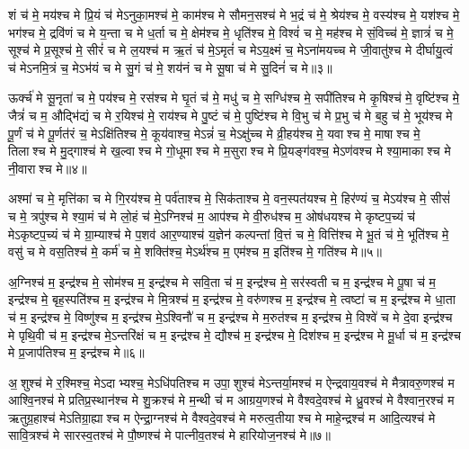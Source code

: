 शं च॑ मे॒ मय॑श्च मे प्रि॒यं च॑ मेऽनुका॒मश्च॑ मे॒ काम॑श्च मे सौमन॒सश्च॑ मे भ॒द्रं च॑ मे॒ श्रेय॑श्च मे॒ वस्य॑श्च मे॒ यश॑श्च मे॒ भग॑श्च मे॒ द्रवि॑णं च मे य॒न्ता च मे ध॒र्ता च मे॒ क्षेम॑श्च मे॒ धृति॑श्च मे॒ विश्वं॑ च मे॒ मह॑श्च मे सं॒विच्च॑ मे॒ ज्ञात्रं॑ च मे॒ सूश्च॑ मे प्र॒सूश्च॑ मे॒ सीरं॑ च मे ल॒यश्च॑ म ऋ॒तं च॑ मे॒ऽमृतं॑ च मेऽय॒क्ष्मं च॒ मेऽना॑मयच्च मे जी॒वातु॑श्च मे दीर्घायु॒त्वं च॑ मेऽनमि॒त्रं च॒ मेऽभ॑यं च मे सु॒गं च॑ मे॒ शय॑नं च मे सू॒षा च॑ मे सु॒दिनं॑ च मे॥३॥ 

ऊर्क्च॑ मे सू॒नृता॑ च मे॒ पय॑श्च मे॒ रस॑श्च मे घृ॒तं च॑ मे॒ मधु॑ च मे॒ सग्धि॑श्च मे॒ सपी॑तिश्च मे कृ॒षिश्च॑ मे॒ वृष्टि॑श्च मे॒ जैत्रं॑ च म॒ औद्भि॑द्यं च मे र॒यिश्च॑ मे॒ राय॑श्च मे पु॒ष्टं च॑ मे॒ पुष्टि॑श्च मे वि॒भु च॑ मे प्र॒भु च॑ मे ब॒हु च॑ मे॒ भूय॑श्च मे पू॒र्णं च॑ मे पू॒र्णत॑रं च॒ मेऽक्षि॑तिश्च मे॒ कूय॑वाश्च॒ मेऽन्नं॑ च॒ मेऽक्षु॑च्च मे व्री॒हय॑श्च मे॒ यवाश्च मे॒ माषाश्च मे॒ तिलाश्च मे मु॒द्गाश्च॑ मे ख॒ल्वाश्च मे गो॒धूमाश्च मे म॒सुराश्च मे प्रि॒यङ्ग॑वश्च॒ मेऽण॑वश्च मे श्या॒माकाश्च मे नी॒वाराश्च मे॥४॥ 

अश्मा॑ च मे॒ मृत्ति॑का च मे गि॒रय॑श्च मे॒ पर्व॑ताश्च मे॒ सिक॑ताश्च मे॒ वन॒स्पत॑यश्च मे॒ हिर॑ण्यं च॒ मेऽय॑श्च मे॒ सीसं॑ च मे॒ त्रपु॑श्च मे श्या॒मं च॑ मे लो॒हं च॑ मे॒ऽग्निश्च॑ म॒ आप॑श्च मे वी॒रुध॑श्च म॒ ओष॑धयश्च मे कृष्टप॒च्यं च॑ मेऽकृष्टप॒च्यं च॑ मे ग्रा॒म्याश्च॑ मे प॒शव॑ आर॒ण्याश्च॑ य॒ज्ञेन॑ कल्पन्तां वि॒त्तं च मे॒ वित्ति॑श्च मे भू॒तं च॑ मे॒ भूति॑श्च मे॒ वसु॑ च मे वस॒तिश्च॑ मे॒ कर्म॑ च मे॒ शक्ति॑श्च॒ मेऽर्थ॑श्च म॒ एम॑श्च म॒ इति॑श्च मे॒ गति॑श्च मे॥५॥ 

अ॒ग्निश्च॑ म॒ इन्द्र॑श्च मे॒ सोम॑श्च म॒ इन्द्र॑श्च मे सवि॒ता च॑ म॒ इन्द्र॑श्च मे॒ सर॑स्वती च म॒ इन्द्र॑श्च मे पू॒षा च॑ म॒ इन्द्र॑श्च मे॒ बृह॒स्पति॑श्च म॒ इन्द्र॑श्च मे मि॒त्रश्च॑ म॒ इन्द्र॑श्च मे॒ वरु॑णश्च म॒ इन्द्र॑श्च मे॒ त्वष्टा॑ च म॒ इन्द्र॑श्च मे धा॒ता च॑ म॒ इन्द्र॑श्च मे॒ विष्णु॑श्च म॒ इन्द्र॑श्च मे॒ऽश्विनौ॑ च म॒ इन्द्र॑श्च मे म॒रुत॑श्च म॒ इन्द्र॑श्च मे॒ विश्वे॑ च मे दे॒वा इन्द्र॑श्च मे पृथि॒वी च॑ म॒ इन्द्र॑श्च मे॒ऽन्तरि॑क्षं च म॒ इन्द्र॑श्च मे॒ द्यौश्च॑ म॒ इन्द्र॑श्च मे॒ दिश॑श्च म॒ इन्द्र॑श्च मे मू॒र्धा च॑ म॒ इन्द्र॑श्च मे प्र॒जाप॑तिश्च म॒ इन्द्र॑श्च मे॥६॥ 

अ॒शुश्च॑ मे र॒श्मिश्च॒ मेऽदाभ्यश्च॒ मेऽधि॑पतिश्च म उपा॒शुश्च॑ मेऽन्तर्या॒मश्च॑ म ऐन्द्रवाय॒वश्च॑ मे मैत्रावरु॒णश्च॑ म आश्वि॒नश्च॑ मे प्रतिप्र॒स्थान॑श्च मे शु॒क्रश्च॑ मे म॒न्थी च॑ म आग्रय॒णश्च॑ मे वैश्वदे॒वश्च॑ मे ध्रु॒वश्च॑ मे वैश्वान॒रश्च॑ म ऋतुग्र॒हाश्च॑ मेऽतिग्रा॒ह्याश्च म ऐन्द्रा॒ग्नश्च॑ मे वैश्वदे॒वश्च॑ मे मरुत्व॒तीयाश्च मे माहे॒न्द्रश्च॑ म आदि॒त्यश्च॑ मे सावि॒त्रश्च॑ मे सारस्व॒तश्च॑ मे पौ॒ष्णश्च॑ मे पात्नीव॒तश्च॑ मे हारियोज॒नश्च॑ मे॥७॥ 

